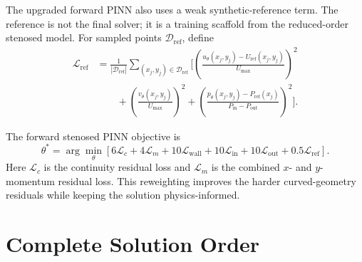 \documentclass[11pt]{article}
\begin{document}
The upgraded forward PINN also uses a weak synthetic-reference term. The reference is not the final solver; it is a training scaffold from the reduced-order stenosed model. For sampled points $\mathcal{D}_{\mathrm{ref}}$, define
\begin{equation}
    \begin{aligned}
        \mathcal{L}_{\mathrm{ref}}
        &=
        \frac{1}{|\mathcal{D}_{\mathrm{ref}}|}
        \sum_{(x_j,y_j)\in\mathcal{D}_{\mathrm{ref}}}
        \bigg[
            \left(
                \frac{u_{\theta}(x_j,y_j)-U_{\mathrm{ref}}(x_j,y_j)}
                {U_{\max}}
            \right)^2 \\
        &\qquad
            +
            \left(
                \frac{v_{\theta}(x_j,y_j)}
                {U_{\max}}
            \right)^2
            +
            \left(
                \frac{p_{\theta}(x_j,y_j)-P_{\mathrm{ref}}(x_j)}
                {P_{\mathrm{in}}-P_{\mathrm{out}}}
            \right)^2
        \bigg].
    \end{aligned}
\end{equation}

The forward stenosed PINN objective is
\begin{equation}
    \theta^{\ast}
    =
    \arg\min_{\theta}
    \left[
        6\mathcal{L}_{c}
        +
        4\mathcal{L}_{m}
        +
        10\mathcal{L}_{\mathrm{wall}}
        +
        10\mathcal{L}_{\mathrm{in}}
        +
        10\mathcal{L}_{\mathrm{out}}
        +
        0.5\mathcal{L}_{\mathrm{ref}}
    \right].
\end{equation}
Here $\mathcal{L}_{c}$ is the continuity residual loss and $\mathcal{L}_{m}$ is the combined $x$- and $y$-momentum residual loss. This reweighting improves the harder curved-geometry residuals while keeping the solution physics-informed.

\section{Complete Solution Order}
\end{document}
